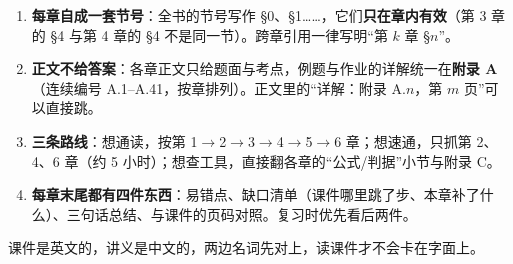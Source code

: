 \documentclass[11pt]{ctexart}
\begin{document}

\begin{enumerate}
  \item \textbf{每章自成一套节号}：全书的节号写作 §0、§1……，它们\textbf{只在章内有效}（第 3 章的 §4 与第 4 章的 §4 不是同一节）。跨章引用一律写明“第 $k$ 章 §$n$”。
  \item \textbf{正文不给答案}：各章正文只给题面与考点，例题与作业的详解统一在\textbf{附录 A}（连续编号 A.1--A.41，按章排列）。正文里的“详解：附录 A.$n$，第 $m$ 页”可以直接跳。
  \item \textbf{三条路线}：想通读，按第 1$\to$2$\to$3$\to$4$\to$5$\to$6 章；想速通，只抓第 2、4、6 章（约 5 小时）；想查工具，直接翻各章的“公式/判据”小节与附录 C。
  \item \textbf{每章末尾都有四件东西}：易错点、缺口清单（课件哪里跳了步、本章补了什么）、三句话总结、与课件的页码对照。复习时优先看后两件。
\end{enumerate}



课件是英文的，讲义是中文的，两边名词先对上，读课件才不会卡在字面上。
\end{document}
